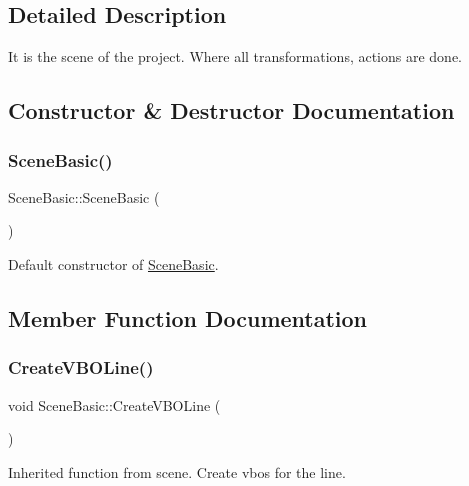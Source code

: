 \subsection{Detailed Description}
It is the scene of the project. Where all transformations, actions are done. 

\subsection{Constructor \& Destructor Documentation}
\hypertarget{class_scene_basic_a4eedd794e7e095992bda1566f2e3bd2e}{}\label{class_scene_basic_a4eedd794e7e095992bda1566f2e3bd2e} 
\subsubsection{\texorpdfstring{Scene\+Basic()}{SceneBasic()}}
{\footnotesize\ttfamily Scene\+Basic\+::\+Scene\+Basic (\begin{DoxyParamCaption}{ }\end{DoxyParamCaption})}



Default constructor of \hyperlink{class_scene_basic}{Scene\+Basic}. 



\subsection{Member Function Documentation}
\hypertarget{class_scene_basic_ac0cc945b040983d7527cda36963ec711}{}\label{class_scene_basic_ac0cc945b040983d7527cda36963ec711} 
\subsubsection{\texorpdfstring{Create\+V\+B\+O\+Line()}{CreateVBOLine()}}
{\footnotesize\ttfamily void Scene\+Basic\+::\+Create\+V\+B\+O\+Line (\begin{DoxyParamCaption}{ }\end{DoxyParamCaption})\hspace{0.3cm}{\ttfamily [virtual]}}



Inherited function from scene. Create vbos for the line. 



